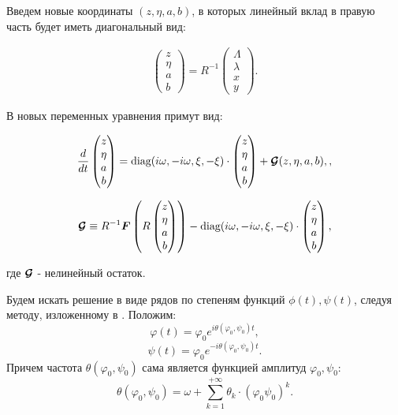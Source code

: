 Введем новые координаты $(z,\eta,a,b)$, в которых линейный вклад в правую часть будет иметь диагональный вид:

\begin{align}
\begin{pmatrix}
z \\ \eta \\ a \\ b 
\end{pmatrix} = R^{-1} \begin{pmatrix}
\Lambda \\ \lambda \\ x \\ y 
\end{pmatrix}.
\end{align}

В новых переменных уравнения примут вид:

\begin{align}
\frac{d}{dt}
\begin{pmatrix}
z \\ \eta \\ a \\ b 
\end{pmatrix} = \text{diag}(i \omega, -i \omega, \xi, -\xi) \cdot
\begin{pmatrix}
z \\ \eta \\ a \\ b 
\end{pmatrix} + \boldsymbol{\mathcal{G}}(z,\eta,a,b),
\label{new_eq},
\end{align}

\begin{align*}
\boldsymbol{\mathcal{G}} \equiv R^{-1} \boldsymbol{F} \left(R\begin{pmatrix}
z \\ \eta \\ a \\ b 
\end{pmatrix} \right) - \text{diag}(i \omega, -i \omega, \xi, -\xi) \cdot 
\begin{pmatrix}
z \\ \eta \\ a \\ b 
\end{pmatrix},
\end{align*}

где $\boldsymbol{\mathcal{G}}$ - нелинейный остаток.

Будем искать решение в виде рядов по степеням функций $\phi(t), \psi(t)$, следуя методу,
изложенному в \cite{siegel}. Положим:
$$\varphi(t) = \varphi_0 e^{i \theta (\varphi_0, \psi_0) t},$$
$$\psi(t) = \varphi_0 e^{-i \theta (\varphi_0, \psi_0) t}.$$
Причем частота $\theta (\varphi_0, \psi_0)$ сама является функцией амплитуд $\varphi_0, \psi_0$:
$$\theta(\varphi_0, \psi_0) = \omega + \sum_{k=1}^{+\infty}{\theta_k \cdot (\varphi_0 \psi_0)^k}.$$

